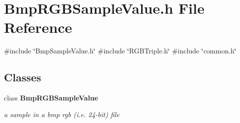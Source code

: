 \section{Bmp\+R\+G\+B\+Sample\+Value.\+h File Reference}
\label{BmpRGBSampleValue_8h}
{\ttfamily \#include \char`\"{}Bmp\+Sample\+Value.\+h\char`\"{}}\newline
{\ttfamily \#include \char`\"{}R\+G\+B\+Triple.\+h\char`\"{}}\newline
{\ttfamily \#include \char`\"{}common.\+h\char`\"{}}\newline
\subsection*{Classes}
\begin{DoxyCompactItemize}
\item 
class \textbf{ Bmp\+R\+G\+B\+Sample\+Value}
\begin{DoxyCompactList}\small\item\em a sample in a bmp rgb (i.\+e. 24-\/bit) file \end{DoxyCompactList}\end{DoxyCompactItemize}
